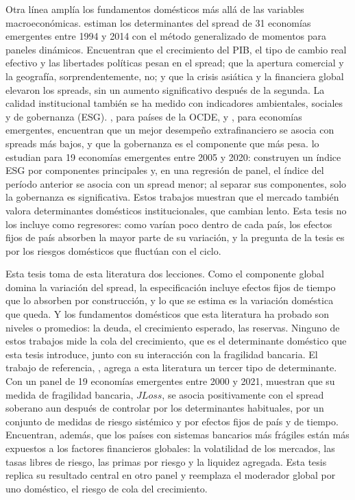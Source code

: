 Otra línea amplía los fundamentos domésticos más allá de las variables macroeconómicas. \citet{TebaldiNguyenZuluaga2018} estiman los determinantes del spread de 31 economías emergentes entre 1994 y 2014 con el método generalizado de momentos para paneles dinámicos. Encuentran que el crecimiento del PIB, el tipo de cambio real efectivo y las libertades políticas pesan en el spread; que la apertura comercial y la geografía, sorprendentemente, no; y que la crisis asiática y la financiera global elevaron los spreads, sin un aumento significativo después de la segunda. La calidad institucional también se ha medido con indicadores ambientales, sociales y de gobernanza (ESG). \citet{CapelleBlancardEtAl2019}, para países de la OCDE, y \citet{MargareticPouget2018}, para economías emergentes, encuentran que un mejor desempeño extrafinanciero se asocia con spreads más bajos, y que la gobernanza es el componente que más pesa. \citet{BarnecheGrezziPanario2024} lo estudian para 19 economías emergentes entre 2005 y 2020: construyen un índice ESG por componentes principales y, en una regresión de panel, el índice del período anterior se asocia con un spread menor; al separar sus componentes, solo la gobernanza es significativa. Estos trabajos muestran que el mercado también valora determinantes domésticos institucionales, que cambian lento. Esta tesis no los incluye como regresores: como varían poco dentro de cada país, los efectos fijos de país absorben la mayor parte de su variación, y la pregunta de la tesis es por los riesgos domésticos que fluctúan con el ciclo.

Esta tesis toma de esta literatura dos lecciones. Como el componente global domina la variación del spread, la especificación incluye efectos fijos de tiempo que lo absorben por construcción, y lo que se estima es la variación doméstica que queda. Y los fundamentos domésticos que esta literatura ha probado son niveles o promedios: la deuda, el crecimiento esperado, las reservas. Ninguno de estos trabajos mide la cola del crecimiento, que es el determinante doméstico que esta tesis introduce, junto con su interacción con la fragilidad bancaria. El trabajo de referencia, \citet{Chari2024b}, agrega a esta literatura un tercer tipo de determinante. Con un panel de 19 economías emergentes entre 2000 y 2021, muestran que su medida de fragilidad bancaria, $JLoss$, se asocia positivamente con el spread soberano aun después de controlar por los determinantes habituales, por un conjunto de medidas de riesgo sistémico y por efectos fijos de país y de tiempo. Encuentran, además, que los países con sistemas bancarios más frágiles están más expuestos a los factores financieros globales: la volatilidad de los mercados, las tasas libres de riesgo, las primas por riesgo y la liquidez agregada. Esta tesis replica su resultado central en otro panel y reemplaza el moderador global por uno doméstico, el riesgo de cola del crecimiento.

